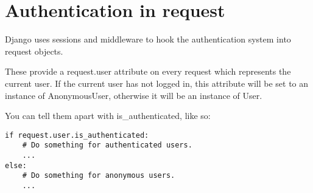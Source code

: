 
\chapter{Authentication in request}

Django uses sessions and middleware to hook the authentication system into request objects.

These provide a request.user attribute on every request which represents the current user.
If the current user has not logged in, this attribute will be set to an instance of AnonymousUser, otherwise it will be an instance of User.

You can tell them apart with is_authenticated, like so:

\begin{lstlisting}
if request.user.is_authenticated:
    # Do something for authenticated users.
    ...
else:
    # Do something for anonymous users.
    ...  
\end{lstlisting}


